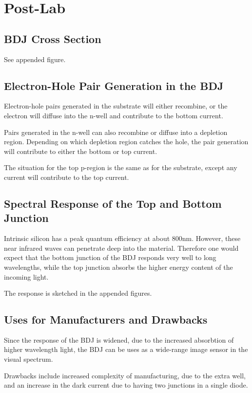 

\newcommand{\reffig}[1]{Fig.~\ref{#1}}



\newpage
\section{Post-Lab}
\subsection{BDJ Cross Section}
See appended figure.

\subsection{Electron-Hole Pair Generation in the BDJ}
Electron-hole pairs generated in the substrate will either recombine,
or the electron will diffuse into the n-well and contribute to the bottom current.

Pairs generated in the n-well can also recombine or diffuse into a depletion region.
Depending on which depletion region catches the hole, the pair generation will contribute to
either the bottom or top current.

The situation for the top p-region is the same as for the substrate, except any current will 
contribute to the top current.

\subsection{Spectral Response of the Top and Bottom Junction}
Intrinsic silicon has a peak quantum efficiency at about 800nm. However, these near infrared waves can
penetrate deep into the material. Therefore one would expect that the bottom junction of the BDJ
responds very well to long wavelengths, while the top junction absorbs the higher energy content of
the incoming light.

The response is sketched in the appended figures.

\subsection{Uses for Manufacturers and Drawbacks}
Since the response of the BDJ is widened, due to the increased absorbtion of higher wavelength light,
the BDJ can be uses as a wide-range image sensor in the visual spectrum.

Drawbacks include increased complexity of manufacturing, due to the extra well, and an increase in the dark
current due to having two junctions in a single diode.

